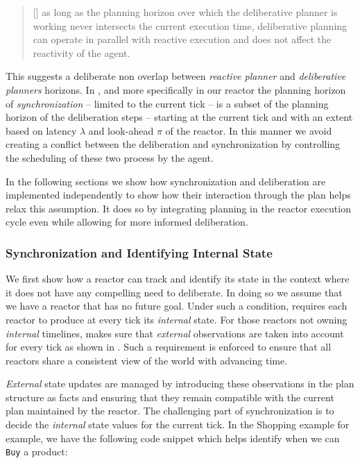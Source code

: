 {\scriptsize
  \begin{quote}
  [\textellipsis] as long as the planning horizon over which the
  deliberative planner is working never intersects the current
  execution time, deliberative planning can operate in parallel with
  reactive execution and does not affect the reactivity of the agent. 
\end{quote}}

This suggests a deliberate non overlap between  {\em
  reactive planner} and {\em deliberative planners} horizons. In \rxe,
and more specifically in our \eu reactor the planning horizon of {\em
  synchronization} -- limited to the current tick -- is a subset of
the planning horizon of the deliberation steps -- starting at the
current tick and with an extent based on latency $\lambda$ and
look-ahead $\pi$ of the reactor. In this manner we avoid creating a
conflict between the deliberation and synchronization by controlling
the scheduling of these two process by the \rx agent.

In the following sections we show how synchronization and deliberation
are implemented independently to show how their interaction through
the plan helps relax this assumption. It does so by integrating
planning in the reactor execution cycle even while allowing for more
informed deliberation.

\subsubsection{Synchronization and Identifying Internal State}
\label{sec:arch:synch}

We first show how a reactor can track and identify its state in the
context where it does not have any compelling need to deliberate. In
doing so we assume that we have a reactor that has no future
goal. Under such a condition, \rx requires each reactor to produce at
every tick its {\em internal} state. For those reactors not owning
{\em internal} timelines, \rx makes sure that {\em external}
observations are taken into account for every tick as shown in
\cite{py10}. Such a requirement is enforced to ensure that all
reactors share a consistent view of the world with advancing time.

{\em External} state updates are managed by introducing these
observations in the plan structure as facts and ensuring that they
remain compatible with the current plan maintained by the reactor. The
challenging part of synchronization is to decide the {\em internal}
state values for the current tick. In the Shopping example for example,
we have the following code snippet which helps identify when we can
\texttt{Buy} a product:


